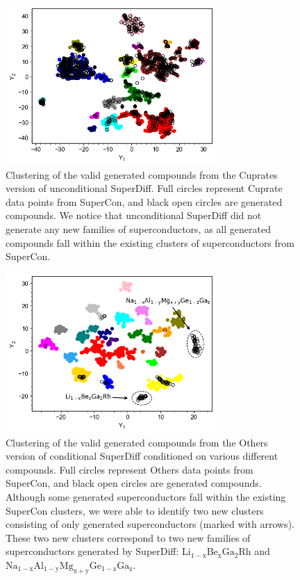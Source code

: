 \documentclass[%
reprint,
 amsmath,amssymb,
 aps,
prb,
]{revtex4-2}
\begin{document}
\begin{figure}
    \hspace*{-0.5cm}\includegraphics[width=8cm]{unconditional_clustering.png}
    \caption{Clustering of the valid generated compounds from the Cuprates version of unconditional SuperDiff. Full circles represent Cuprate data points from SuperCon, and black open circles are generated compounds. We notice that unconditional SuperDiff did not generate any new families of superconductors, as all generated compounds fall within the existing clusters of superconductors from SuperCon.}
    \label{fig:tsne_unconditional}
\end{figure}

\begin{figure}
    \hspace*{-0.5cm}\includegraphics[width=8cm]{newconditionalclustering.png}
    \caption{Clustering of the valid generated compounds from the Others version of conditional SuperDiff conditioned on various different compounds. Full circles represent Others data points from SuperCon, and black open circles are generated compounds. Although some generated superconductors fall within the existing SuperCon clusters, we were able to identify two new clusters consisting of only generated superconductors (marked with arrows). These two new clusters correspond to two new families of superconductors generated by SuperDiff: $\mathrm{Li_{1-x}Be_{x}Ga_{2}Rh}$ and $\mathrm{Na_{1-x}Al_{1-y}Mg_{x+y}Ge_{1-z}Ga_{z}}$.}
    \label{fig:tsne_conditional}
\end{figure}
\end{document}

